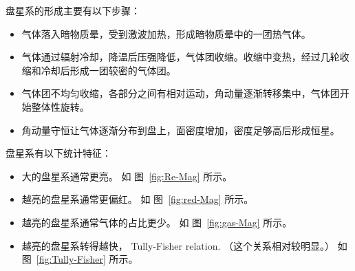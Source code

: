 \documentclass[12pt]{ctexart}
\newcommand{\reffig}[1]{图~\ref{#1}}
\begin{document}
盘星系的形成主要有以下步骤：
\begin{itemize}
    \item 气体落入暗物质晕，受到激波加热，形成暗物质晕中的一团热气体。
    \item 气体通过辐射冷却，降温后压强降低，气体团收缩。收缩中变热，经过几轮收缩和冷却后形成一团较密的气体团。
    \item 气体团不均匀收缩，各部分之间有相对运动，角动量逐渐转移集中，气体团开始整体性旋转。
    \item 角动量守恒让气体逐渐分布到盘上，面密度增加，密度足够高后形成恒星。
\end{itemize}

盘星系有以下统计特征：
\begin{itemize}
    \item 大的盘星系通常更亮。 如 \reffig{fig:Re-Mag} 所示。
    \item 越亮的盘星系通常更偏红。 如 \reffig{fig:red-Mag} 所示。
    \item 越亮的盘星系通常气体的占比更少。 如 \reffig{fig:gas-Mag} 所示。
    \item 越亮的盘星系转得越快， Tully-Fisher relation. （这个关系相对较明显。） 如 \reffig{fig:Tully-Fisher} 所示。
\end{itemize}
\end{document}

